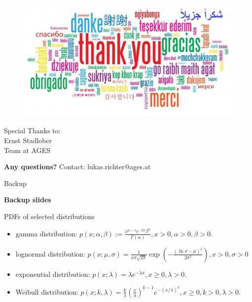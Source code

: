 \documentclass[
  ignorenonframetext,
  aspectratio=169,
]{beamer}
\begin{document}
\begin{frame}{}
\protect\hypertarget{section}{}
\begin{center}
\begin{figure}
  \centering
  \includegraphics[width=\textwidth,height=0.5\textheight,keepaspectratio]{img/Thank-you-word-cloud.jpg}
\end{figure}

Special Thanks to:\\
Ernst Stadlober\\
Team at AGES

\pause \Huge{\textbf{Any questions?}}
\vfill
\hfill {\scriptsize Contact: lukas.richter@ages.at}
\end{center}
\end{frame}

\begin{frame}{Backup}
\protect\hypertarget{backup}{}
\begin{center}
\Huge\textbf{Backup slides}
\end{center}
\end{frame}

\begin{frame}{PDFs of selected distributions}
\protect\hypertarget{pdfs-of-selected-distributions}{}
\begin{itemize}
\item gamma distribution: $p(x;\alpha,\beta):=\frac{x^{\alpha-1}e^{-\beta x} \beta^{\alpha}}{\Gamma(\alpha)}, x>0, \alpha>0, \beta>0.$

\item lognormal distribution: $p(x;\mu,\sigma)=\frac{1}{x\sigma\sqrt{2\pi}}\exp\left(-\frac{(\ln x - \mu)^2}{2\sigma^2}\right), x>0, \sigma > 0$

\item exponential distribution: $p(x;\lambda)=\lambda e^{-\lambda x}, x\geq 0, \lambda>0.$

\item Weibull distribution: $p(x;k,\lambda)=\frac{k}{\lambda} \left(\frac{x}{\lambda}\right)^{k-1} e^{{-(x/\lambda)}^k}, x\geq 0, k>0, \lambda>0.$

\end{itemize}
\end{frame}
\end{document}

